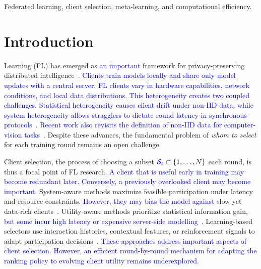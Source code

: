 \documentclass[journal]{IEEEtran}
\newcommand{\revision}[1]{\textcolor{blue}{#1}}
\begin{document}
\renewcommand\IEEEkeywordsname{Index Terms}
\begin{IEEEkeywords}
Federated learning, client selection, meta-learning, and computational efficiency.
\end{IEEEkeywords}
\section{Introduction}

 Learning (FL) has emerged as \revision{an important} framework for privacy-preserving distributed intelligence~\cite{mcmahan2017communication}. \revision{Clients train models locally and share only model updates with a central server. FL clients vary in hardware capabilities, network conditions, and local data distributions. This heterogeneity creates two coupled challenges. Statistical heterogeneity causes client drift under non-IID data, while system heterogeneity allows stragglers to dictate round latency in synchronous protocols}~\cite{karimireddy2020scaffold,mai2024study,tapwal2026stragglers,forootani2026asynchronous}. \revision{Recent work also revisits the definition of non-IID data for computer-vision tasks}~\cite{borazjani2026redefining}. Despite these advances, the fundamental problem of \textit{whom to select} for each training round remains an open challenge.

Client selection, the process of choosing a subset $\revision{\mathcal{S}_t} \subset \{1, \ldots, N\}$ each round, is thus a focal point of FL research. \revision{A client that is useful early in training may become redundant later. Conversely, a previously overlooked client may become important.} System-aware methods maximize feasible participation under latency and resource constraints\revision{. However, they may bias the model against} slow yet data-rich clients~\cite{nishio2019client,chai2020tifl}. Utility-aware methods prioritize statistical information gain\revision{, but some incur high latency or expensive server-side modelling}~\cite{lai2021oort,tang2022fedcor,xu2024federated,yan2023criticalfl,ning2024fedgcs}. Learning-based selectors use interaction histories, contextual features, or reinforcement signals to adapt participation decisions~\cite{wang2020optimizing,pan2024contextual,kazemi2026robust}. \revision{These approaches address important aspects of client selection. However, an efficient round-by-round mechanism for adapting the ranking policy to evolving client utility remains underexplored.}
\end{document}
